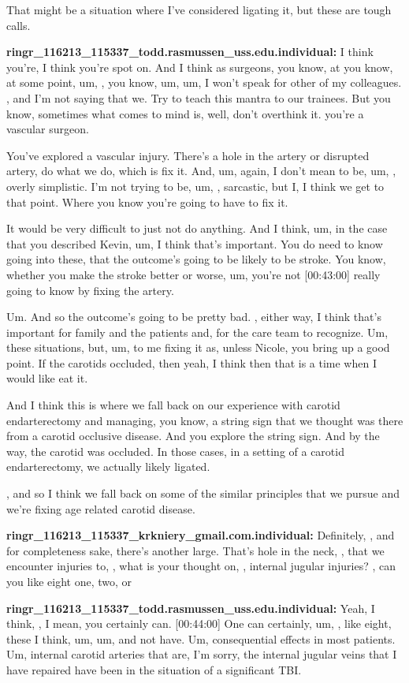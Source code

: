 \documentclass[
]{book}
\begin{document}
That might be a situation where I've considered ligating it, but these
are tough calls.

\textbf{ringr\_116213\_115337\_todd.rasmussen\_uss.edu.individual:} I think
you're, I think you're spot on. And I think as surgeons, you know, at
you know, at some point, um, , you know, um, um, I won't speak for other
of my colleagues. , and I'm not saying that we. Try to teach this mantra
to our trainees. But you know, sometimes what comes to mind is, well,
don't overthink it. you're a vascular surgeon.

You've explored a vascular injury. There's a hole in the artery or
disrupted artery, do what we do, which is fix it. And, um, again, I
don't mean to be, um, , overly simplistic. I'm not trying to be, um, ,
sarcastic, but I, I think we get to that point. Where you know you're
going to have to fix it.

It would be very difficult to just not do anything. And I think, um, in
the case that you described Kevin, um, I think that's important. You do
need to know going into these, that the outcome's going to be likely to
be stroke. You know, whether you make the stroke better or worse, um,
you're not {[}00:43:00{]} really going to know by fixing the artery.

Um. And so the outcome's going to be pretty bad. , either way, I think
that's important for family and the patients and, for the care team to
recognize. Um, these situations, but, um, to me fixing it as, unless
Nicole, you bring up a good point. If the carotids occluded, then yeah,
I think then that is a time when I would like eat it.

And I think this is where we fall back on our experience with carotid
endarterectomy and managing, you know, a string sign that we thought was
there from a carotid occlusive disease. And you explore the string sign.
And by the way, the carotid was occluded. In those cases, in a setting
of a carotid endarterectomy, we actually likely ligated.

, and so I think we fall back on some of the similar principles that we
pursue and we're fixing age related carotid disease.

\textbf{ringr\_116213\_115337\_krkniery\_gmail.com.individual:} Definitely, , and
for completeness sake, there's another large. That's hole in the neck, ,
that we encounter injuries to, , what is your thought on, , internal
jugular injuries? , can you like eight one, two, or

\textbf{ringr\_116213\_115337\_todd.rasmussen\_uss.edu.individual:} Yeah, I
think, , I mean, you certainly can. {[}00:44:00{]} One can certainly, um, ,
like eight, these I think, um, um, and not have. Um, consequential
effects in most patients. Um, internal carotid arteries that are, I'm
sorry, the internal jugular veins that I have repaired have been in the
situation of a significant TBI.
\end{document}
